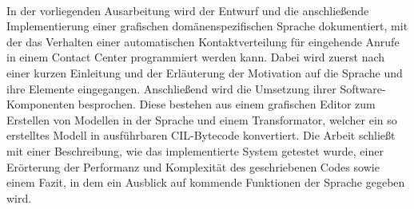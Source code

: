 \kurzfassung

\paragraph*{}
In der vorliegenden Ausarbeitung wird der Entwurf und die anschließende Implementierung einer grafischen domänenspezifischen Sprache dokumentiert, mit der das Verhalten einer automatischen Kontaktverteilung für eingehende Anrufe in einem Contact Center programmiert werden kann. Dabei wird zuerst nach einer kurzen Einleitung und der Erläuterung der Motivation auf die Sprache und ihre Elemente eingegangen. Anschließend wird die Umsetzung ihrer Software-Komponenten besprochen. Diese bestehen aus einem grafischen Editor zum Erstellen von Modellen in der Sprache und einem Transformator, welcher ein so erstelltes Modell in ausführbaren CIL-Bytecode konvertiert. Die Arbeit schließt mit einer Beschreibung, wie das implementierte System getestet wurde, einer Erörterung der Performanz und Komplexität des geschriebenen Codes sowie einem Fazit, in dem ein Ausblick auf kommende Funktionen der Sprache gegeben wird.